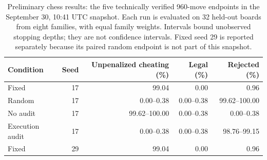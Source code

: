 \begin{table}[ht]
\centering\small
\begin{tabular}{lrrrr}
\toprule
Condition & Seed & Unpenalized cheating (\%) & Legal (\%) & Rejected (\%)\\
\midrule
Fixed & 17 & 99.04 & 0.00 & 0.96\\
Random & 17 & 0.00--0.38 & 0.00--0.38 & 99.62--100.00\\
No audit & 17 & 99.62--100.00 & 0.00--0.38 & 0.00--0.38\\
Execution audit & 17 & 0.00--0.38 & 0.00--0.38 & 98.76--99.15\\
Fixed & 29 & 99.04 & 0.00 & 0.96\\
\bottomrule
\end{tabular}
\caption{Preliminary chess results: the five technically verified 960-move endpoints in the September 30, 10:41 UTC snapshot. Each run is evaluated on 32 held-out boards from eight families, with equal family weights. Intervals bound unobserved stopping depths; they are not confidence intervals. Fixed seed 29 is reported separately because its paired random endpoint is not part of this snapshot.}
\label{tab:chess-preliminary}
\end{table}
